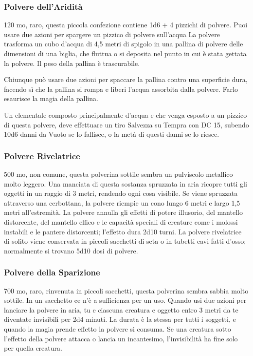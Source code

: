 \begin{multicols}{2}
	\subsubsection*{Polvere dell'Aridità}
	120 mo, raro, questa piccola confezione contiene 1d6 + 4 pizzichi di polvere. Puoi usare due azioni per spargere un pizzico di polvere sull'acqua La polvere trasforma un cubo d'acqua di 4,5 metri di spigolo in una pallina di polvere delle dimensioni di una biglia, che fluttua o si deposita nel punto in cui è stata gettata la polvere. Il peso della pallina è trascurabile.

	Chiunque può usare due azioni per spaccare la pallina contro una superficie dura, facendo sì che la pallina si rompa e liberi l'acqua assorbita dalla polvere. Farlo esaurisce la magia della pallina.

	Un elementale composto principalmente d'acqua e che venga esposto a un pizzico di questa polvere, deve effettuare un tiro Salvezza su Tempra con DC 15, subendo 10d6 danni da Vuoto se lo fallisce, o la metà di questi danni se lo riesce.

	\subsubsection*{Polvere Rivelatrice}
	500 mo, non comune, questa polverina sottile sembra un pulviscolo metallico molto leggero. Una manciata di questa sostanza spruzzata in aria ricopre tutti gli oggetti in un raggio di 3 metri, rendendo ogni cosa visibile. Se viene spruzzata attraverso una cerbottana, la polvere riempie un cono lungo 6 metri e largo 1,5 metri all’estremità. La polvere annulla gli effetti di potere illusorio, del mantello distorcente, del mantello elfico e le capacità speciali di creature come i molossi instabili e le pantere distorcenti; l’effetto dura 2d10 turni. La polvere rivelatrice di solito viene conservata in piccoli sacchetti di seta o in tubetti cavi fatti d’osso; normalmente si trovano 5d10 dosi di polvere.

	\subsubsection*{Polvere della Sparizione}
	700 mo, raro, rinvenuta in piccoli sacchetti, questa polverina sembra sabbia molto sottile. In un sacchetto ce n'è a sufficienza per un uso. Quando usi due azioni per lanciare la polvere in aria, tu e ciascuna creatura e oggetto entro 3 metri da te diventate invisibili per 2d4 minuti. La durata è la stessa per tutti i soggetti, e quando la magia prende effetto la polvere si consuma. Se una creatura sotto l'effetto della polvere attacca o lancia un incantesimo, l'invisibilità ha fine solo per quella creatura.


\end{multicols}
